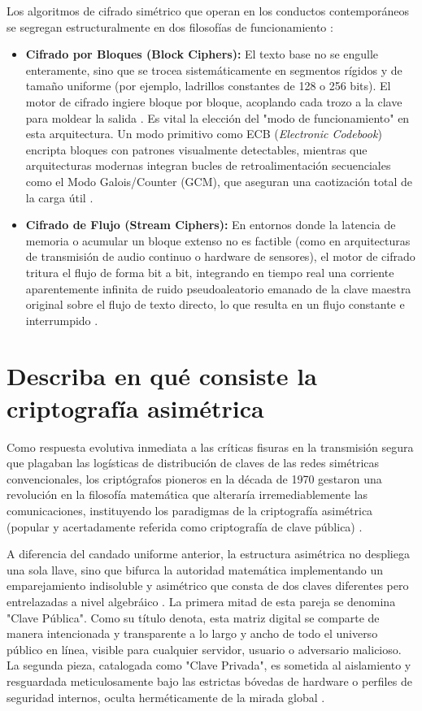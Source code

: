 \documentclass[a4paper,12pt]{article}
\begin{document}
Los algoritmos de cifrado simétrico que operan en los conductos contemporáneos se segregan estructuralmente en dos filosofías de funcionamiento \cite{ibm_crypto_types}:
\begin{itemize}
    \item \textbf{Cifrado por Bloques (Block Ciphers):} El texto base no se engulle enteramente, sino que se trocea sistemáticamente en segmentos rígidos y de tamaño uniforme (por ejemplo, ladrillos constantes de 128 o 256 bits). El motor de cifrado ingiere bloque por bloque, acoplando cada trozo a la clave para moldear la salida \cite{ibm_crypto_types}. Es vital la elección del "modo de funcionamiento" en esta arquitectura. Un modo primitivo como ECB (\textit{Electronic Codebook}) encripta bloques con patrones visualmente detectables, mientras que arquitecturas modernas integran bucles de retroalimentación secuenciales como el Modo Galois/Counter (GCM), que aseguran una caotización total de la carga útil \cite{keyfactor_sym}.
    \item \textbf{Cifrado de Flujo (Stream Ciphers):} En entornos donde la latencia de memoria o acumular un bloque extenso no es factible (como en arquitecturas de transmisión de audio continuo o hardware de sensores), el motor de cifrado tritura el flujo de forma bit a bit, integrando en tiempo real una corriente aparentemente infinita de ruido pseudoaleatorio emanado de la clave maestra original sobre el flujo de texto directo, lo que resulta en un flujo constante e interrumpido \cite{ibm_crypto_types, keyfactor_sym}.
\end{itemize}

\section{Describa en qué consiste la criptografía asimétrica}

Como respuesta evolutiva inmediata a las críticas fisuras en la transmisión segura que plagaban las logísticas de distribución de claves de las redes simétricas convencionales, los criptógrafos pioneros en la década de 1970 gestaron una revolución en la filosofía matemática que alteraría irremediablemente las comunicaciones, instituyendo los paradigmas de la criptografía asimétrica (popular y acertadamente referida como criptografía de clave pública) \cite{ibm_crypto_use, redes_crypto}.

A diferencia del candado uniforme anterior, la estructura asimétrica no despliega una sola llave, sino que bifurca la autoridad matemática implementando un emparejamiento indisoluble y asimétrico que consta de dos claves diferentes pero entrelazadas a nivel algebráico \cite{redes_crypto, aws_ssl}. La primera mitad de esta pareja se denomina "Clave Pública". Como su título denota, esta matriz digital se comparte de manera intencionada y transparente a lo largo y ancho de todo el universo público en línea, visible para cualquier servidor, usuario o adversario malicioso. La segunda pieza, catalogada como "Clave Privada", es sometida al aislamiento y resguardada meticulosamente bajo las estrictas bóvedas de hardware o perfiles de seguridad internos, oculta herméticamente de la mirada global \cite{redes_crypto, aws_ssl}. 
\end{document}
